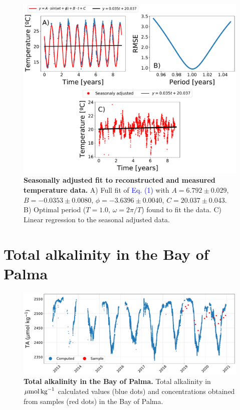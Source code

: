 \begin{figure}[H]
    \centering
    \includegraphics[width=\textwidth]{Figures/Trend_seasonality_T.pdf}
    \caption[Seasonally adjusted fit to reconstructed and measured
        temperature data]{\textbf{Seasonally adjusted fit to reconstructed and
            measured
            temperature data.} A) Full fit of \textcolor{blue}{Eq. (1)} with
        $A=6.792 \pm
            0.029$, $B=-0.0353 \pm 0.0080$, $\phi=-3.6396 \pm 0.0040$,
        $C=20.037 \pm
            0.043$. B) Optimal period ($T=1.0$, $\omega=2\pi/T$) found to fit
        the data. C)
        Linear regression to the seasonal adjusted data.}
    \label{fig:seasonally_adjusted_fit_T}
\end{figure}

\section{Total alkalinity in the Bay of Palma}

\begin{figure}[H]
    \centering
    \includegraphics[width=\textwidth]{Figures/S1.pdf}
    \caption[Total alkalinity in the Bay of Palma]{\textbf{Total alkalinity in
            the Bay of Palma.} Total alkalinity in ${\mu
                    \textrm{mol\,kg}^{-1}}$
        calculated
        values (blue dots) and concentrations obtained from samples (red dots)
        in the
        Bay of Palma.}
    \label{fig:S1}
\end{figure}

